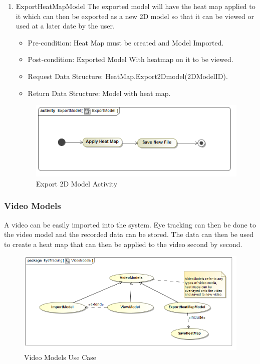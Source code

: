 \begin{enumerate}
		\item{ExportHeatMapModel}
		The exported model will have the heat map applied to it which can then be exported as a new 2D model so that it can be viewed or used at a later date by the user.  
		\begin{itemize}
			\item Pre-condition: Heat Map must be created and Model Imported.
			\item Post-condition: Exported Model With heatmap on it to be viewed.
			\item Request Data Structure: HeatMap.Export2Dmodel(2DModelID).
			\item Return Data Structure: Model with heat map.
		\end{itemize}
		
		\begin{figure}[!ht]
			\centering
			\includegraphics[scale=0.5]{Diagrams/Activity_Diagram__ExportModel__ExportModel.png}
			\caption{Export 2D Model Activity}
		\end{figure}
	
	\end{enumerate}
		
		
	\subsubsection{Video Models}
	A video can be easily imported into the system. Eye tracking can then be done to the video model and the recorded data can be stored. The data can then be used to create a heat map that can then be applied to the video second by second.
	\newline
	
	\begin{figure}[!ht]
		\centering
		\includegraphics[scale=0.5]{Diagrams/Use_Case_Diagram__VideoModels.png}
		\caption{Video Models Use Case}
	\end{figure}
	
